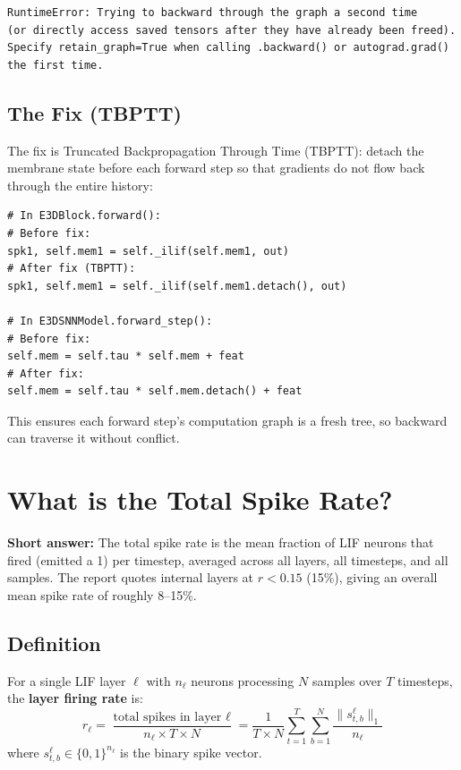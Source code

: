 \documentclass[11pt,a4paper]{article}
\begin{document}
\begin{lstlisting}[language={}]
RuntimeError: Trying to backward through the graph a second time
(or directly access saved tensors after they have already been freed).
Specify retain_graph=True when calling .backward() or autograd.grad()
the first time.
\end{lstlisting}

\subsection{The Fix (TBPTT)}

The fix is Truncated Backpropagation Through Time (TBPTT): detach the membrane
state before each forward step so that gradients do not flow back through the
entire history:

\begin{lstlisting}
# In E3DBlock.forward():
# Before fix:
spk1, self.mem1 = self._ilif(self.mem1, out)
# After fix (TBPTT):
spk1, self.mem1 = self._ilif(self.mem1.detach(), out)

# In E3DSNNModel.forward_step():
# Before fix:
self.mem = self.tau * self.mem + feat
# After fix:
self.mem = self.tau * self.mem.detach() + feat
\end{lstlisting}

This ensures each forward step's computation graph is a fresh tree, so
backward can traverse it without conflict.

\section{What is the Total Spike Rate?}

\begin{answerbox}
\textbf{Short answer:} The total spike rate is the mean fraction of LIF neurons
that fired (emitted a 1) per timestep, averaged across all layers, all timesteps,
and all samples. The report quotes internal layers at $r < 0.15$ (15\%),
giving an overall mean spike rate of roughly 8--15\%.
\end{answerbox}

\subsection{Definition}

For a single LIF layer $\ell$ with $n_\ell$ neurons processing $N$ samples over
$T$ timesteps, the \textbf{layer firing rate} is:
\[
  r_\ell = \frac{\text{total spikes in layer } \ell}{n_\ell \times T \times N}
         = \frac{1}{T \times N} \sum_{t=1}^{T} \sum_{b=1}^{N}
             \frac{\|s^\ell_{t,b}\|_1}{n_\ell}
\]
where $s^\ell_{t,b} \in \{0,1\}^{n_\ell}$ is the binary spike vector.
\end{document}
